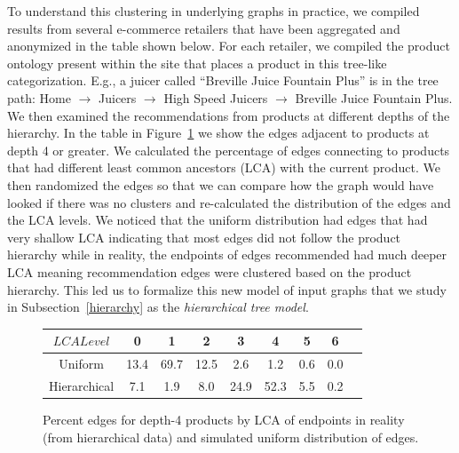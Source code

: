  To understand this clustering in underlying
graphs in practice, we compiled results from several e-commerce
retailers that
 have been aggregated and anonymized in the table
shown below. For each
 retailer, we compiled the product ontology
present within the
 site that places a product in this tree-like
categorization. E.g., a
 juicer called ``Breville Juice Fountain
Plus'' is in the tree path:
 Home $\rightarrow$ Juicers $\rightarrow$
High Speed Juicers
 $\rightarrow$ Breville Juice Fountain Plus. We
then examined the
 recommendations from products at different depths
of the hierarchy. In
 the table in Figure~\ref{fig:hier} we show the
edges adjacent to
 products at depth 4 or greater. We calculated the
percentage of edges
 connecting to products that had different least
common ancestors (LCA) with the current product.  We
 then randomized
the edges so that we can compare how the graph would
 have looked if
there was no clusters and re-calculated the
 distribution of the
edges and the LCA levels. We noticed that the
 uniform distribution
had edges that had very shallow LCA indicating that
 most edges did
not follow the product hierarchy while in reality,
 the endpoints of
edges recommended had much deeper LCA meaning recommendation edges
were clustered based on the product hierarchy. This led us
 to
formalize this new model of input graphs that we study in
Subsection~\ref{hierarchy}
 as the {\em hierarchical tree model}.

\begin{figure}[h]
  \centering
  \begin{tabular}{ |c|c|c|c|c|c|c|c|c| }
    \hline
    $LCA Level$ & 0 & 1 & 2 & 3 & 4 & 5 & 6 \\ \hline
    Uniform & 13.4 & 69.7 & 12.5 & 2.6 & 1.2 & 0.6 & 0.0 \\ \hline
    Hierarchical & 7.1 & 1.9 & 8.0 & 24.9 & 52.3 & 5.5 & 0.2\\
    \hline
  \end{tabular}
  \caption{Percent edges for depth-4 products by LCA of endpoints in reality (from hierarchical data) and simulated uniform distribution of edges.}\label{fig:hier}
\end{figure}


